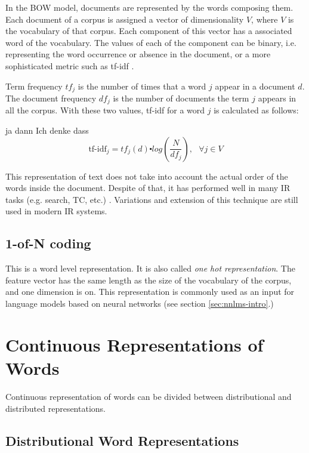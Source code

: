 In the \ac{BOW} model, documents are represented by the words composing them.
Each document of a corpus is assigned a vector of dimensionality $V$, where $V$ is the
vocabulary of that corpus. Each component of this vector has a associated word of
the vocabulary. The values of each of the component can be binary, i.e. representing the
word occurrence or absence in the document, or a more sophisticated metric
such as \ac{tf-idf} \cite{Salton88term-weightingapproaches}.

Term frequency $tf_j$  is the number of times that a word $j$ appear in a
document $d$. The document frequency  $df_{j}$  is the number of documents
the term $j$ appears in all the corpus.  With these two values,  \ac{tf-idf}  for a  word $j$ is  calculated as follows:

ja dann Ich denke dass \begin{equation*}
  \label{eq:tf-idf}
  \text{tf-idf}_{j}=tf_{j}(d)\centerdot log(\frac{N}{df_{j}}),\,\,\,\,\forall
  j \in V
\end{equation*}

This representation of text does not take  into account the actual order of the words inside the document. Despite
of that, it has  performed well in many \ac{IR} tasks (e.g. search, \ac{TC},
etc.) \cite{Sebastiani02}. Variations and extension of this technique are
still used in modern \ac{IR} systems.

 \subsection{1-of-N coding}
 \label{sec:1_of_coding}

 This is a word level representation. It is also called \textit{one hot
   representation}. The feature vector has the same length as the size of the
 vocabulary of the corpus, and  one dimension is on.  This representation is
 commonly used as an input for language models based on neural networks (see
 section \ref{sec:nnlms-intro}.)


 \section{Continuous Representations of Words}

\label{sec:sub_continuous_representation}
 Continuous representation  of words  can be divided between distributional and
 distributed representations. 

\subsection{Distributional Word Representations}

